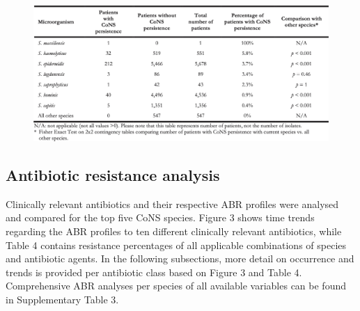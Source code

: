 \documentclass[
]{book}
\begin{document}
\begin{figure}

{\centering \includegraphics[width=1\linewidth]{images/07-t03} 

}

\end{figure}

\hypertarget{antibiotic-resistance-analysis}{%
\subsection{Antibiotic resistance analysis}\label{antibiotic-resistance-analysis}}

Clinically relevant antibiotics and their respective ABR profiles were analysed and compared for the top five CoNS species. Figure 3 shows time trends regarding the ABR profiles to ten different clinically relevant antibiotics, while Table 4 contains resistance percentages of all applicable combinations of species and antibiotic agents. In the following subsections, more detail on occurrence and trends is provided per antibiotic class based on Figure 3 and Table 4. Comprehensive ABR analyses per species of all available variables can be found in Supplementary Table 3.
\end{document}
